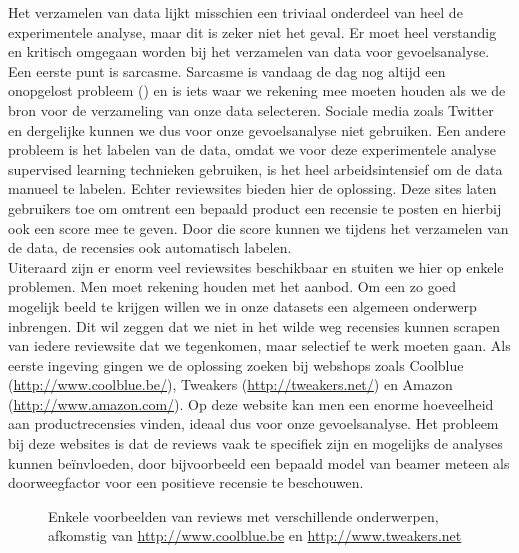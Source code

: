 Het verzamelen van data lijkt misschien een triviaal onderdeel van heel de experimentele analyse, maar dit is zeker niet het geval. Er moet heel verstandig en kritisch omgegaan worden bij het verzamelen van data voor gevoelsanalyse. Een eerste punt is sarcasme. Sarcasme is vandaag de dag nog altijd een onopgelost probleem (\cite{liebrecht2013perfect}) en is iets waar we rekening mee moeten houden als we de bron voor de verzameling van onze data selecteren. Sociale media zoals Twitter en dergelijke kunnen we dus voor onze gevoelsanalyse niet gebruiken. Een andere probleem is het labelen van de data, omdat we voor deze experimentele analyse supervised learning technieken gebruiken, is het heel arbeidsintensief om de data manueel te labelen. Echter reviewsites bieden hier de oplossing. Deze sites laten gebruikers toe om omtrent een bepaald product een recensie te posten en hierbij ook een score mee te geven. Door die score kunnen we tijdens het verzamelen van de data, de recensies ook automatisch labelen.\\

Uiteraard zijn er enorm veel reviewsites beschikbaar en stuiten we hier op enkele problemen. Men moet rekening houden met het aanbod. Om een zo goed mogelijk beeld te krijgen willen we in onze datasets een algemeen onderwerp inbrengen. Dit wil zeggen dat we niet in het wilde weg recensies kunnen scrapen van iedere reviewsite dat we tegenkomen, maar selectief te werk moeten gaan. Als eerste ingeving gingen we de oplossing zoeken bij webshops zoals Coolblue (\url{http://www.coolblue.be/}), Tweakers (\url{http://tweakers.net/}) en Amazon (\url{http://www.amazon.com/}). Op deze website kan men een enorme hoeveelheid aan productrecensies vinden, ideaal dus voor onze gevoelsanalyse. Het probleem bij deze websites is dat de reviews vaak te specifiek zijn en mogelijks de analyses kunnen be\"invloeden, door bijvoorbeeld een bepaald model van beamer meteen als doorweegfactor voor een positieve recensie te beschouwen.

\begin{figure}%
    \centering
    \caption{Enkele voorbeelden van reviews met verschillende onderwerpen, afkomstig van \url{http://www.coolblue.be} en \url{http://www.tweakers.net} }
\end{figure}

